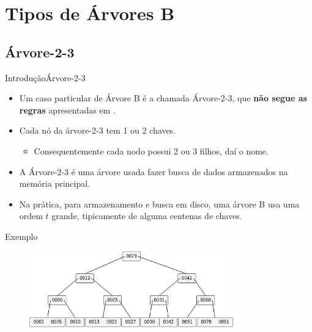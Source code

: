 \documentclass[aspectratio=169]{beamer}
\begin{document}
{%
\section{Tipos de Árvores B}
\subsection{Árvore-2-3}

\begin{frame}{Introdução}{Árvore-2-3}
\begin{itemize}
 \item Um caso particular de Árvore B é a chamada Árvore-2-3, que {\bf não segue as regras} apresentadas em \cite{Cormen2012}.
 \item Cada nó da árvore-2-3 tem 1 ou 2 chaves.
 \begin{itemize}
 \item Consequentemente cada nodo possui 2 ou 3 filhos, daí o nome. 
 \end{itemize}
 \item A Árvore-2-3 é uma árvore usada fazer busca de dados armazenados na memória principal.
 \item Na prática, para armazenamento e busca em disco, uma árvore B usa uma ordem $t$ grande, tipicamente de alguma centenas de chaves.
\end{itemize}
\end{frame}


\begin{frame}{Exemplo}
\begin{figure}[!h]
\centering
   \includegraphics[width=250pt]{imagens/arvore-2-3.png}
  \label{fig_arvore-2-3}
\end{figure} 
\end{frame}

}
\end{document}
